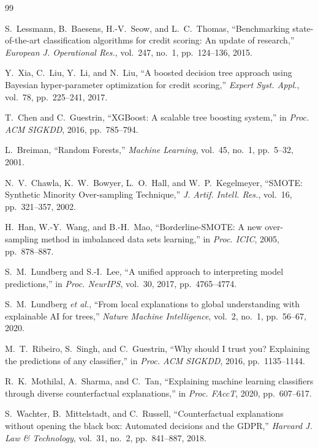 \documentclass[journal]{IEEEtran}
\begin{document}
\begin{thebibliography}{99}

S.~Lessmann, B.~Baesens, H.-V.~Seow, and L.~C.~Thomas,
``Benchmarking state-of-the-art classification algorithms for credit scoring: An update of research,''
\textit{European J. Operational Res.}, vol.~247, no.~1, pp.~124--136, 2015.

Y.~Xia, C.~Liu, Y.~Li, and N.~Liu,
``A boosted decision tree approach using Bayesian hyper-parameter optimization for credit scoring,''
\textit{Expert Syst. Appl.}, vol.~78, pp.~225--241, 2017.

T.~Chen and C.~Guestrin,
``XGBoost: A scalable tree boosting system,''
in \textit{Proc. ACM SIGKDD}, 2016, pp.~785--794.

L.~Breiman,
``Random Forests,''
\textit{Machine Learning}, vol.~45, no.~1, pp.~5--32, 2001.

N.~V.~Chawla, K.~W.~Bowyer, L.~O.~Hall, and W.~P.~Kegelmeyer,
``SMOTE: Synthetic Minority Over-sampling Technique,''
\textit{J. Artif. Intell. Res.}, vol.~16, pp.~321--357, 2002.

H.~Han, W.-Y.~Wang, and B.-H.~Mao,
``Borderline-SMOTE: A new over-sampling method in imbalanced data sets learning,''
in \textit{Proc. ICIC}, 2005, pp.~878--887.

S.~M.~Lundberg and S.-I.~Lee,
``A unified approach to interpreting model predictions,''
in \textit{Proc. NeurIPS}, vol.~30, 2017, pp.~4765--4774.

S.~M.~Lundberg \textit{et al.},
``From local explanations to global understanding with explainable AI for trees,''
\textit{Nature Machine Intelligence}, vol.~2, no.~1, pp.~56--67, 2020.

M.~T.~Ribeiro, S.~Singh, and C.~Guestrin,
``Why should I trust you? Explaining the predictions of any classifier,''
in \textit{Proc. ACM SIGKDD}, 2016, pp.~1135--1144.

R.~K.~Mothilal, A.~Sharma, and C.~Tan,
``Explaining machine learning classifiers through diverse counterfactual explanations,''
in \textit{Proc. FAccT}, 2020, pp.~607--617.

S.~Wachter, B.~Mittelstadt, and C.~Russell,
``Counterfactual explanations without opening the black box: Automated decisions and the GDPR,''
\textit{Harvard J. Law \& Technology}, vol.~31, no.~2, pp.~841--887, 2018.


\end{thebibliography}
\end{document}

